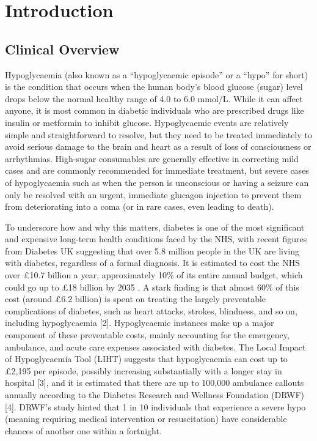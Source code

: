 \section{Introduction}

\begin{flushleft}
\end{flushleft}

\subsection{Clinical Overview}
\par{ \noindent Hypoglycaemia (also known as a “hypoglycaemic episode” or a “hypo” for short) is the condition that occurs when the human body’s blood glucose (sugar) level drops below the normal healthy range of 4.0 to 6.0 mmol/L. While it can affect anyone, it is most common in diabetic individuals who are prescribed drugs like insulin or metformin to inhibit glucose. Hypoglycaemic events are relatively simple and straightforward to resolve, but they need to be treated immediately to avoid serious damage to the brain and heart as a result of loss of consciousness or arrhythmias. High-sugar consumables are generally effective in correcting mild cases and are commonly recommended for immediate treatment, but severe cases of hypoglycaemia such as when the person is unconscious or having a seizure can only be resolved with an urgent, immediate glucagon injection to prevent them from deteriorating into a coma (or in rare cases, even leading to death). }


\vspace{10pt}
\par{\noindent To underscore how and why this matters, diabetes is one of the most significant and expensive long-term health conditions faced by the NHS, with recent figures from Diabetes UK suggesting that over 5.8 million people in the UK are living with diabetes, regardless of a formal diagnosis. It is estimated to cost the NHS over £10.7 billion a year, approximately 10\% of its entire annual budget, which could go up to £18 billion by 2035 \cite{diabetesnumbers}. A stark finding is that almost 60\% of this cost (around £6.2 billion) is spent on treating the largely preventable complications of diabetes, such as heart attacks, strokes, blindness, and so on, including hypoglycaemia [2]. Hypoglycaemic instances make up a major component of these preventable costs, mainly accounting for the emergency, ambulance, and acute care expenses associated with diabetes. The Local Impact of Hypoglycaemia Tool (LIHT) suggests that hypoglycaemia can cost up to £2,195 per episode, possibly increasing substantially with a longer stay in hospital [3], and it is estimated that there are up to 100,000 ambulance callouts annually according to the Diabetes Research and Wellness Foundation (DRWF) [4]. DRWF’s study hinted that 1 in 10 individuals that experience a severe hypo (meaning requiring medical intervention or resuscitation) have considerable chances of another one within a fortnight.}

